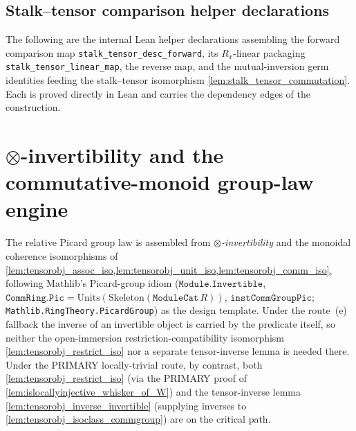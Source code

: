 \subsection{Stalk--tensor comparison helper declarations}
\label{subsec:tensorobj_stalktensor_helpers}

The following are the internal Lean helper declarations assembling the forward
comparison map \texttt{stalk\_tensor\_desc\_forward}, its \(R_x\)-linear packaging
\texttt{stalk\_tensor\_linear\_map}, the reverse map, and the mutual-inversion germ
identities feeding the stalk--tensor isomorphism \cref{lem:stalk_tensor_commutation}.
Each is proved directly in Lean and carries the dependency edges of the construction.

\section{\(\otimes\)-invertibility and the commutative-monoid group-law engine}
\label{sec:tensorobj_invertibility}

The relative Picard group law is assembled from \emph{\(\otimes\)-invertibility}
and the monoidal coherence isomorphisms of
\cref{lem:tensorobj_assoc_iso,lem:tensorobj_unit_iso,lem:tensorobj_comm_iso},
following Mathlib's Picard-group idiom (\(\mathtt{Module.Invertible}\),
\(\mathtt{CommRing.Pic} = \mathrm{Units}(\mathrm{Skeleton}(\mathtt{ModuleCat}\,R))\),
\(\mathtt{instCommGroupPic}\); \texttt{Mathlib.RingTheory.PicardGroup}) as the
design template. Under the route~(e) fallback the inverse of an invertible object
is carried by the predicate itself, so neither the open-immersion
restriction-compatibility isomorphism \cref{lem:tensorobj_restrict_iso} nor a
separate tensor-inverse lemma is needed there. Under the PRIMARY locally-trivial
route, by contrast, both \cref{lem:tensorobj_restrict_iso} (via the PRIMARY proof
of \cref{lem:islocallyinjective_whisker_of_W}) and the tensor-inverse lemma
\cref{lem:tensorobj_inverse_invertible} (supplying inverses to
\cref{lem:tensorobj_isoclass_commgroup}) are on the critical path.

